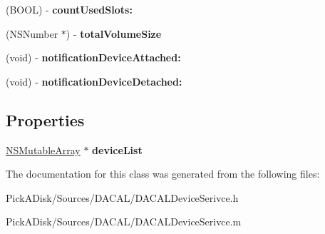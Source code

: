 \begin{DoxyCompactItemize}
\item 
\hypertarget{interface_d_a_c_a_l_device_service_aca460625faff703361b7b993203c59ae}{
(BOOL) -\/ {\bfseries countUsedSlots:}}
\label{interface_d_a_c_a_l_device_service_aca460625faff703361b7b993203c59ae}

\item 
\hypertarget{interface_d_a_c_a_l_device_service_a3acecc1fffe0ec829656aa212f8074dc}{
(NSNumber $\ast$) -\/ {\bfseries totalVolumeSize}}
\label{interface_d_a_c_a_l_device_service_a3acecc1fffe0ec829656aa212f8074dc}

\item 
\hypertarget{interface_d_a_c_a_l_device_service_a151c51ef5840455d1e1a907e72449c43}{
(void) -\/ {\bfseries notificationDeviceAttached:}}
\label{interface_d_a_c_a_l_device_service_a151c51ef5840455d1e1a907e72449c43}

\item 
\hypertarget{interface_d_a_c_a_l_device_service_a60e30391373aa77921a5cf63c92161ba}{
(void) -\/ {\bfseries notificationDeviceDetached:}}
\label{interface_d_a_c_a_l_device_service_a60e30391373aa77921a5cf63c92161ba}

\end{DoxyCompactItemize}
\subsection*{Properties}
\begin{DoxyCompactItemize}
\item 
\hypertarget{interface_d_a_c_a_l_device_service_a22a54209b694699055a833fc823068a3}{
\hyperlink{class_n_s_mutable_array}{NSMutableArray} $\ast$ {\bfseries deviceList}}
\label{interface_d_a_c_a_l_device_service_a22a54209b694699055a833fc823068a3}

\end{DoxyCompactItemize}


The documentation for this class was generated from the following files:\begin{DoxyCompactItemize}
\item 
PickADisk/Sources/DACAL/DACALDeviceSerivce.h\item 
PickADisk/Sources/DACAL/DACALDeviceSerivce.m\end{DoxyCompactItemize}
